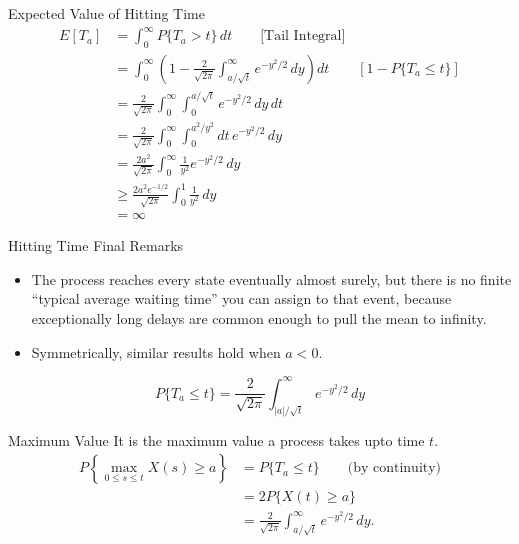 \documentclass{beamer}
\begin{document}
	\begin{frame}{Expected Value of Hitting Time}
		\[
		\begin{aligned}
			E[T_a]
			&= \int_0^\infty P\{T_a > t\}\,dt \qquad \text{[Tail Integral]} \\[4pt]
			&= \int_0^\infty \left(1 - \frac{2}{\sqrt{2\pi}} \int_{a/\sqrt{t}}^\infty e^{-y^2/2}\,dy \right) dt \qquad [1-P\{T_a\le t\}] \\[4pt]
			&= \frac{2}{\sqrt{2\pi}} \int_0^\infty \int_0^{a/\sqrt{t}} e^{-y^2/2}\,dy\,dt \\[4pt]
			&= \frac{2}{\sqrt{2\pi}} \int_0^\infty \int_0^{a^2/y^2} dt\, e^{-y^2/2}\,dy \\[4pt]
			&= \frac{2a^2}{\sqrt{2\pi}} \int_0^\infty \frac{1}{y^2} e^{-y^2/2}\,dy \\[4pt]
			&\ge \frac{2a^2 e^{-1/2}}{\sqrt{2\pi}} \int_0^1 \frac{1}{y^2}\,dy \\[4pt]
			&= \infty
		\end{aligned}
		\]
	\end{frame}
	
	\begin{frame}{Hitting Time Final Remarks}
		\begin{itemize}
			\item The process reaches every state eventually almost surely, but there is no finite “typical average waiting time” you can assign to that event, because exceptionally long delays are common enough to pull the mean to infinity.
			\item Symmetrically, similar results hold when $a<0$.
		\end{itemize}
		
		\begin{center}
			\[
			P\{T_a \le t\}
			=
			\frac{2}{\sqrt{2\pi}}
			\int_{|a|/\sqrt{t}}^\infty e^{-y^2/2}\,dy
			\]
		\end{center}
		
	\end{frame}
	
	\begin{frame}{Maximum Value}
		It is the maximum value a process takes upto time $t$.
		\[
		\begin{aligned}
			P\left\{ \max_{0 \le s \le t} X(s) \ge a \right\}
			&= P\{T_a \le t\}
			\qquad \text{(by continuity)} \\
			&= 2P\{X(t)\ge a\} \\
			&= \frac{2}{\sqrt{2\pi}} \int_{a/\sqrt{t}}^\infty e^{-y^2/2}\,dy.
		\end{aligned}
		\]
	\end{frame}
	
\end{document}
